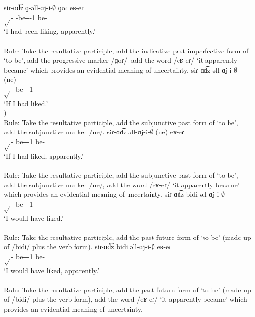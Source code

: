\begin{exe}
\begin{xlist}
		\ex \gll siɾ-ɑd͡z ɡ-əll-ɑj-i-$\emptyset$ ɡoɾ eʁ-eɾ \\
		$\sqrt{}$-{\rptcp} {\ind}-be-{\thgloss}-{\pst}-1{\sg} {\prog} be-{\eptcp} \\
		\trans `I had been liking, apparently.' \\
		 \\ 
		Rule: Take the resultative participle, add the indicative past imperfective form of `to be', add the progressive marker /ɡoɾ/, add the word /eʁ-eɾ/ `it apparently became' which provides an evidential meaning of uncertainty.
		\ex \gll siɾ-ɑd͡z əll-ɑj-i-$\emptyset$ (ne) \\
		$\sqrt{}$-{\rptcp} be-{\thgloss}-{\pst}-1{\sg} {\sbjv} \\
		\trans `If I had liked.' \\
		) \\
		Rule: Take the resultative participle, add the subjunctive past form of `to be', add the subjunctive marker /ne/.
		\ex \gll siɾ-ɑd͡z əll-ɑj-i-$\emptyset$ (ne) eʁ-eɾ \\
		$\sqrt{}$-{\rptcp} be-{\thgloss}-{\pst}-1{\sg} {\sbjv} be-{\eptcp} \\
		\trans `If I had liked, apparently.' \\
		 \\
		Rule: Take the resultative participle, add the subjunctive past form of `to be', add the subjunctive marker /ne/, add the word /eʁ-eɾ/ `it apparently became' which provides an evidential meaning of uncertainty.
		\ex \gll siɾ-ɑd͡z bidi əll-ɑj-i-$\emptyset$ \\
		$\sqrt{}$-{\rptcp} {\fut} be-{\thgloss}-{\pst}-1{\sg} \\
		\trans `I would have liked.' \\
		 \\
		Rule: Take the resultative participle, add the past future form of `to be' (made up of /bidi/ plus the verb form). 
		\ex \gll siɾ-ɑd͡z bidi əll-ɑj-i-$\emptyset$ eʁ-eɾ \\
		$\sqrt{}$-{\rptcp} {\fut} be-{\thgloss}-{\pst}-1{\sg} be-{\eptcp} \\
		\trans `I would have liked, apparently.' \\
		 \\
		Rule: Take the resultative participle, add the past future form of `to be' (made up of /bidi/ plus the verb form), add the word /eʁ-eɾ/ `it apparently became' which provides an evidential meaning of uncertainty. 

\end{xlist}
\end{exe}
